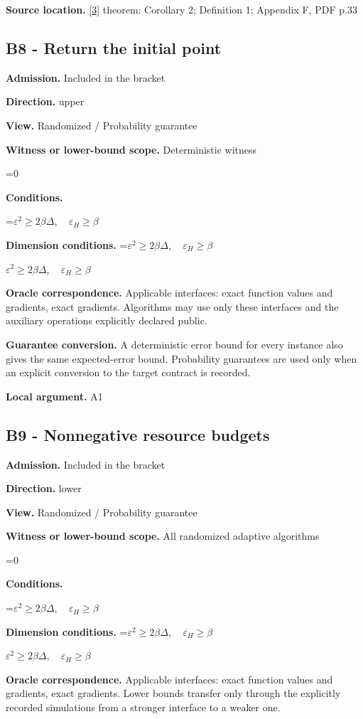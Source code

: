 \documentclass[10pt,a4paper]{article}
\newcommand{\AtlasMath}[1]{\par\begingroup\centering\setbox0=\hbox{$\displaystyle #1$}\ifdim\wd0>1.4\linewidth\typeout{ATLAS WIDE FORMULA: \the\wd0}\fi\ifdim\wd0>\linewidth\resizebox{\linewidth}{!}{\box0}\else\box0\fi\par\endgroup}
\newcommand{\AtlasInlineMath}[1]{\begingroup\setbox0=\hbox{$#1$}\ifdim\wd0>.4\linewidth\endgroup\AtlasMath{#1}\else\endgroup$#1$\fi}
\begin{document}
\textbf{Source location.} \href{https://proceedings.mlr.press/v235/kontogiannis24a.html}{[3]} theorem: Corollary 2; Definition 1; Appendix F, PDF p.33

\subsection{B8 - Return the initial point}
\textbf{Admission.} Included in the bracket

\textbf{Direction.} upper

\textbf{View.} Randomized / Probability guarantee

\textbf{Witness or lower-bound scope.} Deterministic witness

\AtlasMath{0}
\textbf{Conditions.} 
\AtlasMath{\varepsilon^2\ge2\beta\Delta,\quad\varepsilon_H\ge\beta}


\textbf{Dimension conditions.} \AtlasInlineMath{\varepsilon^2\ge2\beta\Delta,\quad\varepsilon_H\ge\beta}

\textbf{Oracle correspondence.} Applicable interfaces: exact function values and gradients, exact gradients. Algorithms may use only these interfaces and the auxiliary operations explicitly declared public.

\textbf{Guarantee conversion.} A deterministic error bound for every instance also gives the same expected-error bound. Probability guarantees are used only when an explicit conversion to the target contract is recorded.

\textbf{Local argument.} A1

\subsection{B9 - Nonnegative resource budgets}
\textbf{Admission.} Included in the bracket

\textbf{Direction.} lower

\textbf{View.} Randomized / Probability guarantee

\textbf{Witness or lower-bound scope.} All randomized adaptive algorithms

\AtlasMath{0}
\textbf{Conditions.} 
\AtlasMath{\varepsilon^2\ge2\beta\Delta,\quad\varepsilon_H\ge\beta}


\textbf{Dimension conditions.} \AtlasInlineMath{\varepsilon^2\ge2\beta\Delta,\quad\varepsilon_H\ge\beta}

\textbf{Oracle correspondence.} Applicable interfaces: exact function values and gradients, exact gradients. Lower bounds transfer only through the explicitly recorded simulations from a stronger interface to a weaker one.
\end{document}
